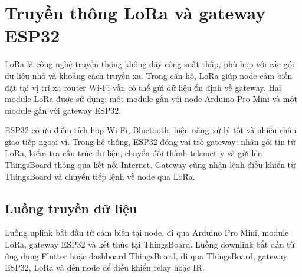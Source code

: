 \section{Truyền thông LoRa và gateway ESP32}
LoRa là công nghệ truyền thông không dây công suất thấp, phù hợp với các gói dữ liệu nhỏ và khoảng cách truyền xa. Trong căn hộ, LoRa giúp node cảm biến đặt tại vị trí xa router Wi-Fi vẫn có thể gửi dữ liệu ổn định về gateway. Hai module LoRa được sử dụng: một module gắn với node Arduino Pro Mini và một module gắn với gateway ESP32.

ESP32 có ưu điểm tích hợp Wi-Fi, Bluetooth, hiệu năng xử lý tốt và nhiều chân giao tiếp ngoại vi. Trong hệ thống, ESP32 đóng vai trò gateway: nhận gói tin từ LoRa, kiểm tra cấu trúc dữ liệu, chuyển đổi thành telemetry và gửi lên ThingsBoard thông qua kết nối Internet. Gateway cũng nhận lệnh điều khiển từ ThingsBoard và chuyển tiếp lệnh về node qua LoRa.

\subsection{Luồng truyền dữ liệu}
Luồng uplink bắt đầu từ cảm biến tại node, đi qua Arduino Pro Mini, module LoRa, gateway ESP32 và kết thúc tại ThingsBoard. Luồng downlink bắt đầu từ ứng dụng Flutter hoặc dashboard ThingsBoard, đi qua ThingsBoard, gateway ESP32, LoRa và đến node để điều khiển relay hoặc IR.
